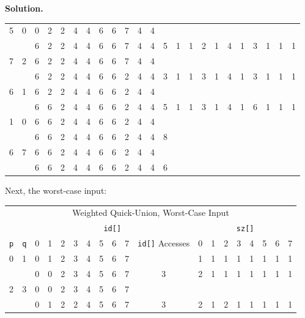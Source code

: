 \documentclass[12pt, a4paper]{article}
\newenvironment{sol}[1][Solution]
{\par\medskip\noindent \textbf{#1.} }
{\medskip}
\begin{document}
\begin{sol}
\begin{center}
\begin{tabular}{cc|cccccccccc|c|cccccccccc}
				5  & 0  & {\color{green}0} & 2  & 2 & 4 & 4 & {\color{green}6} & {\color{green}6} & 7 & 4 & 4 & {}\\
				{} & {} & {\color{red}6} & 2  & 2 & 4 & 4 & 6 & 6 & 7 & 4 & 4 & 5
				& 1 & 1 & 2 & 1 & 4 & 1 & 3& 1  & 1 & 1\\
				
				7  & 2  & 6 & {\color{green}2}  & {\color{green}2} & 4 & 4 & 6 & 6 & {\color{green}7} & 4 & 4 & {}\\
				{} & {} & 6 & 2  & 2 & 4 & 4 & 6 & 6 & {\color{red}2} & 4 & 4 & 3
				& 1 & 1 & 3 & 1 & 4 & 1 & 3& 1  & 1 & 1\\
				
				6  & 1  & 6 & {\color{green}2}  & 2 & 4 & 4 & 6 & {\color{green}6} & 2 & 4 & 4 & {}\\
				{} & {} & 6 & {\color{green}6}  & 2 & 4 & 4 & 6 & 6 & 2 & 4 & 4 & 5
				& 1 & 1 & 3 & 1 & 4 & 1 & 6& 1  & 1 & 1\\
				
				1  & 0  & 6 & 6  & 2 & 4 & 4 & 6 & 6 & 2 & 4 & 4 & {}\\
				{} & {} & 6 & 6  & 2 & 4 & 4 & 6 & 6 & 2 & 4 & 4 & 8\\
				
				6  & 7  & 6 & 6  & 2 & 4 & 4 & 6 & 6 & 2 & 4 & 4 & {}\\
				{} & {} & 6 & 6  & 2 & 4 & 4 & 6 & 6 & 2 & 4 & 4 & 6\\
			\end{tabular}
		\end{center}
		Next, the worst-case input:
		\begin{center}
			\begin{tabular}{cc|cccccccc|c|cccccccc}
								\multicolumn{19}{c}{Weighted Quick-Union, Worst-Case Input}\\
				{} & {} & \multicolumn{9}{c}{\texttt{id[]}} & \multicolumn{8}{c}{\texttt{sz[]}}\\
				\texttt{p} & \texttt{q} & 0 & 1 & 2 & 3 & 4 & 5 & 6 & 7 & \texttt{id[]} Accesses
				& 0 & 1 & 2 & 3 & 4 & 5 & 6 & 7\\
				\hline
				0  & 1  & {\color{green}0} & {\color{green}1} & 2 & 3 & 4 & 5 & 6 & 7 & {}
				& 1 & 1 & 1 & 1 & 1 & 1 & 1 & 1\\
				{} & {} & 0 & {\color{red}0} & 2 & 3 & 4 & 5 & 6 & 7 & 3
				& 2 & 1 & 1 & 1 & 1 & 1 & 1 & 1\\
				
				2  & 3  & 0 & 0 & {\color{green}2} & {\color{green}3} & 4 & 5 & 6 & 7 & {}\\
				{} & {} & 0 & 1 & 2 & {\color{red}2} & 4 & 5 & 6 & 7 & 3
				& 2 & 1 & 2 & 1 & 1 & 1 & 1 & 1\\
				

\end{tabular}
\end{center}
\end{sol}
\end{document}
